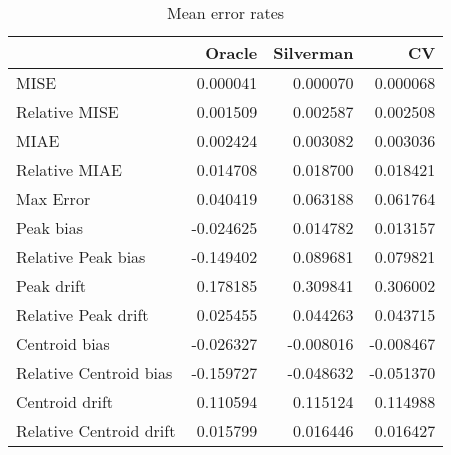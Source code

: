\begin{table}[ht]
\centering
\begin{tabular}{lrrr}
  \hline
 & Oracle & Silverman & CV \\ 
  \hline
MISE & 0.000041 & 0.000070 & 0.000068 \\ 
  Relative MISE & 0.001509 & 0.002587 & 0.002508 \\ 
  MIAE & 0.002424 & 0.003082 & 0.003036 \\ 
  Relative MIAE & 0.014708 & 0.018700 & 0.018421 \\ 
  Max Error & 0.040419 & 0.063188 & 0.061764 \\ 
  Peak bias & -0.024625 & 0.014782 & 0.013157 \\ 
  Relative Peak bias & -0.149402 & 0.089681 & 0.079821 \\ 
  Peak drift & 0.178185 & 0.309841 & 0.306002 \\ 
  Relative Peak drift & 0.025455 & 0.044263 & 0.043715 \\ 
  Centroid bias & -0.026327 & -0.008016 & -0.008467 \\ 
  Relative Centroid bias & -0.159727 & -0.048632 & -0.051370 \\ 
  Centroid drift & 0.110594 & 0.115124 & 0.114988 \\ 
  Relative Centroid drift & 0.015799 & 0.016446 & 0.016427 \\ 
   \hline
\end{tabular}
\caption{Mean error rates} 
\label{tbl:mean_error_rates}
\end{table}

